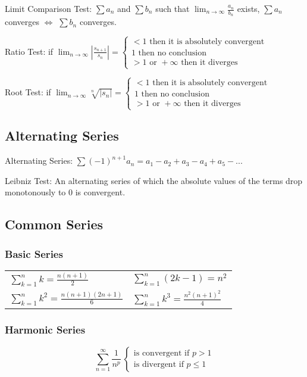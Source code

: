 Limit Comparison Test: $\sum a_n$ and $\sum b_n$ such that $ \lim_{n\rightarrow\infty} \frac{a_n}{b_n}$ exists, $\sum a_n$ converges $\Leftrightarrow$ $\sum b_n$ converges.

Ratio Test: if $\lim_{n\rightarrow \infty}\left|\frac{s_{n+1}}{s_n}\right| = \begin{cases}
<1 \text{ then it is absolutely convergent} \\
1 \text{ then no conclusion} \\
>1 \text{ or } +\infty \text{ then it diverges}
\end{cases}
$

Root Test: if  $\lim_{n\rightarrow \infty} \sqrt[n]{\left|s_n\right|} = \begin{cases}
<1 \text{ then it is absolutely convergent} \\
1 \text{ then no conclusion} \\
>1 \text{ or } +\infty \text{ then it diverges}
\end{cases}
$

\subsection{Alternating Series}
Alternating Series: $ \sum(-1)^{n+1}a_n=a_1-a_2+a_3-a_4+a_5-... $

Leibniz Test: An alternating series of which the absolute values of the terms drop
monotonously to 0 is convergent.

\subsection{Common Series}
\subsubsection{Basic Series}

\begin{tabular}{ l l }
$ \displaystyle \sum_{k=1}^n k = \frac{n(n+1)}{2} $ &
$ \displaystyle \sum_{k=1}^n (2k-1) = n^2 $ \\ [1.5em]
$ \displaystyle \sum_{k=1}^n k^2 = \frac{n(n+1)(2n+1)}{6} $ & 
$ \displaystyle \sum_{k=1}^n k^3 = \frac{n^2(n+1)^2}{4} $
\end{tabular}

\subsubsection{Harmonic Series}
\[
\sum_{n=1}^\infty \frac{1}{n^p} ~ \begin{cases}
									\text{is convergent if } p>1 \\
									\text{is divergent if } p\leq1
									\end{cases}
\]


